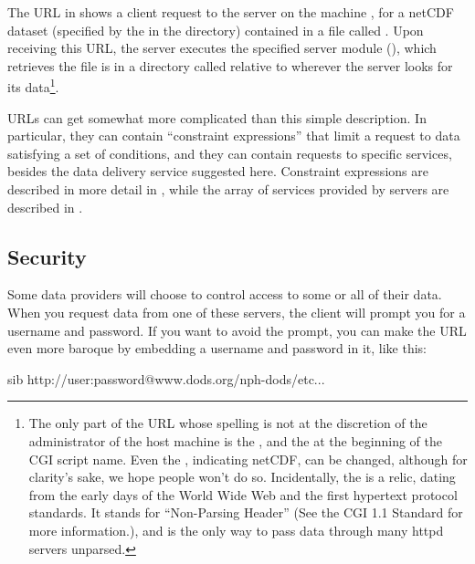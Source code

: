The URL in  shows a client
request to the  server on the machine
, for a netCDF dataset (specified by the
 in the  directory) contained in a file
called .  Upon receiving this URL, the 
server executes the specified \opendap server module (), which
retrieves the file is in a directory called  relative to
wherever the  server looks for its data\footnote{The only
  part of the URL whose spelling is not at the discretion of the
  administrator of the host machine is the , and the
   at the beginning of the CGI script name. Even the
  , indicating netCDF, can be changed, although for clarity's
  sake, we hope people won't do so.  Incidentally, the  is a
  relic, dating from the early days of the World Wide Web and the
  first hypertext protocol standards.  It stands for ``Non-Parsing
  Header'' (See the CGI 1.1 Standard for more information.), and is
  the only way to pass data through many httpd servers unparsed.}.

\opendap URLs can get somewhat more complicated than this simple
description.  In particular, they can contain ``constraint
expressions'' that limit a request to data satisfying a set of
conditions, and they can contain requests to specific \opendap services,
besides the data delivery service suggested here.  Constraint
expressions are described in more detail in
, while the array of services
provided by \opendap servers are described in
. 

\subsection{Security}

Some \opendap data providers will choose to control access to some or all
of their data.  When you request data from one of these servers, the
\opendap client  will prompt you for a username and password.  If you want
to avoid the prompt, you can make the \opendap URL even more baroque by
embedding a username and password in it, like this:

\begin{vcode}{sib}
http://user:password@www.dods.org/nph-dods/etc...
\end{vcode}


